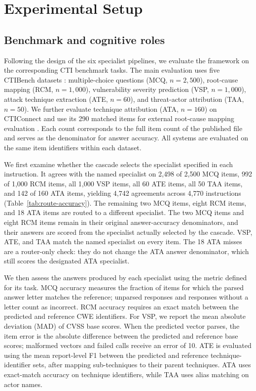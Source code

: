 \documentclass[5p,times,authoryear]{elsarticle}
\begin{document}
\section{Experimental Setup}\label{sec:setup}

\subsection{Benchmark and cognitive roles}\label{sec:benchmark}

Following the design of the six specialist pipelines, we evaluate the framework on the corresponding CTI benchmark tasks. The main evaluation uses five CTIBench datasets \citep{alam2024ctibench}: multiple-choice questions (MCQ, $n{=}2{,}500$), root-cause mapping (RCM, $n{=}1{,}000$), vulnerability severity prediction (VSP, $n{=}1{,}000$), attack technique extraction (ATE, $n{=}60$), and threat-actor attribution (TAA, $n{=}50$). We further evaluate technique attribution (ATA, $n{=}160$) on CTIConnect and use its 290 matched items for external root-cause mapping evaluation \citep{cheng2026cticonnect}. Each count corresponds to the full item count of the published file and serves as the denominator for answer accuracy. All systems are evaluated on the same item identifiers within each dataset.

We first examine whether the cascade selects the specialist specified in each instruction. It agrees with the named specialist on 2,498 of 2,500 MCQ items, 992 of 1,000 RCM items, all 1,000 VSP items, all 60 ATE items, all 50 TAA items, and 142 of 160 ATA items, yielding 4,742 agreements across 4,770 instructions (Table~\ref{tab:route-accuracy}). The remaining two MCQ items, eight RCM items, and 18 ATA items are routed to a different specialist. The two MCQ items and eight RCM items remain in their original answer-accuracy denominators, and their answers are scored from the specialist actually selected by the cascade. VSP, ATE, and TAA match the named specialist on every item. The 18 ATA misses are a router-only check: they do not change the ATA answer denominator, which still scores the designated ATA specialist.

We then assess the answers produced by each specialist using the metric defined for its task. MCQ accuracy measures the fraction of items for which the parsed answer letter matches the reference; unparsed responses and responses without a letter count as incorrect. RCM accuracy requires an exact match between the predicted and reference CWE identifiers. For VSP, we report the mean absolute deviation (MAD) of CVSS base scores. When the predicted vector parses, the item error is the absolute difference between the predicted and reference base scores; malformed vectors and failed calls receive an error of 10. ATE is evaluated using the mean report-level F1 between the predicted and reference technique-identifier sets, after mapping sub-techniques to their parent techniques. ATA uses exact-match accuracy on technique identifiers, while TAA uses alias matching on actor names.
\end{document}
